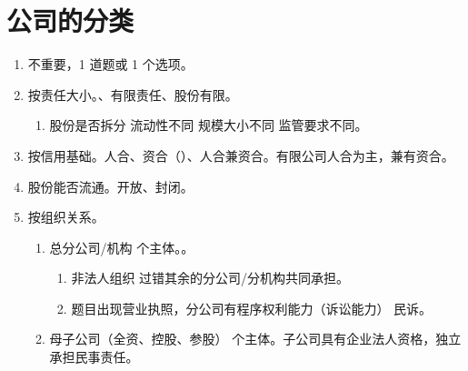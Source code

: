 \section{公司的分类}
\begin{enumerate}
  \item 不重要，1 道题或 1 个选项。
  \item 按责任大小。、有限责任、股份有限。
        \begin{enumerate}
          \item 股份是否拆分 \yjt 流动性不同 \yjt 规模大小不同 \yjt 监管要求不同。
        \end{enumerate}
  \item 按信用基础。人合、资合（）、人合兼资合。有限公司人合为主，兼有资合。
  \item 股份能否流通。开放、封闭。
  \item 按组织关系。
        \begin{enumerate}
          \item 总分公司/机构  个主体。。
                \begin{enumerate}
                  \item 非法人组织 \yjt 过错其余的分公司/分机构共同承担。
                  \item 题目出现营业执照，分公司有程序权利能力（诉讼能力） \yjt 民诉。
                \end{enumerate}
          \item 母子公司（全资、控股、参股）  个主体。子公司具有企业法人资格，独立承担民事责任。
        \end{enumerate}
\end{enumerate}
